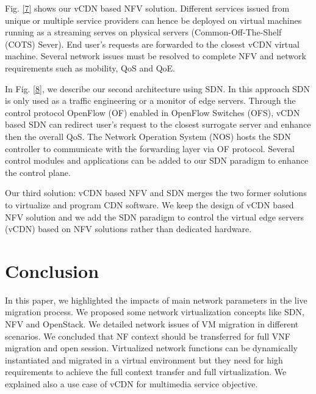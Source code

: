 \documentclass[letterpaper,conference]{IEEEtran}
\begin{document}
Fig. \ref{7} shows our vCDN based NFV solution. Different services issued from unique or multiple service providers can hence be deployed on virtual machines running as a streaming serves on physical servers (Common-Off-The-Shelf (COTS) Sever). End user’s requests are forwarded to the closest vCDN virtual machine. Several network issues must be resolved to complete NFV and network requirements such as mobility, QoS and QoE.

In Fig. \ref{8}, we describe our second architecture using SDN. In this approach SDN is only used as a traffic engineering or a monitor of edge servers. Through the control protocol OpenFlow (OF) enabled in OpenFlow Switches (OFS), vCDN based SDN can redirect user’s request to the closest surrogate server and enhance then the overall QoS. The
Network Operation System (NOS) hosts the SDN controller to communicate with the forwarding layer via OF protocol. Several control modules and applications can be added to our SDN paradigm to enhance the control plane.

Our third solution: vCDN based NFV and SDN merges
the two former solutions to virtualize and program CDN software. We keep the design of vCDN based NFV solution and we add the SDN paradigm to control the virtual edge servers (vCDN) based on NFV solutions rather than dedicated hardware.

\section{Conclusion} 

In this paper, we highlighted the impacts of main network parameters in the live migration process. We proposed some network virtualization concepts like SDN, NFV and OpenStack. We detailed network issues of VM migration in different scenarios. We concluded that NF context should be transferred for full VNF migration and open session. Virtualized network functions can be dynamically instantiated and migrated in a virtual environment but they need for high requirements to achieve the full context transfer and full virtualization. We explained also a use case of vCDN for multimedia service objective.

\ifCLASSOPTIONcaptionsoff
  \newpage
\fi
 
\IEEEtriggercmd{\enlargethispage{-5in}}
\end{document}

